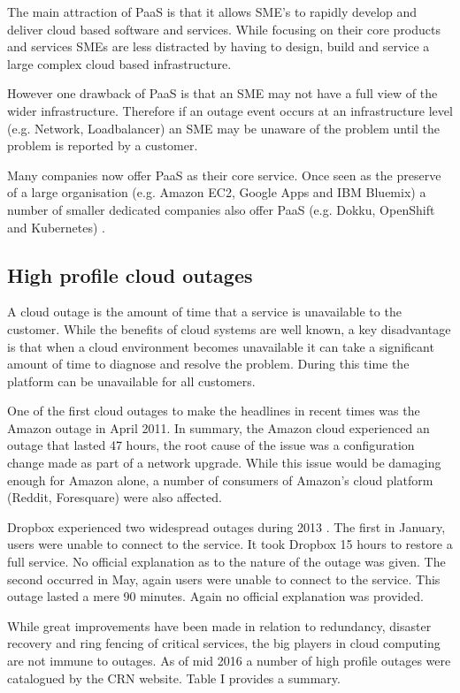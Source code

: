 \documentclass[5p]{elsarticle}
\begin{document}
The main attraction of PaaS is that it allows SME's to rapidly develop and deliver cloud based software and services. While focusing on their core products and services SMEs are less distracted by having to design, build and service a large complex cloud based infrastructure. 

However one drawback of PaaS is that an SME may not have a full view of the wider infrastructure. Therefore if an outage event occurs at an infrastructure level (e.g. Network, Loadbalancer) an SME may be unaware of the problem until the problem is reported by a customer.

Many companies now offer PaaS as their core service. Once seen as the preserve of a large organisation (e.g. Amazon EC2, Google Apps and IBM Bluemix) a number of smaller dedicated companies also offer PaaS (e.g. Dokku, OpenShift and Kubernetes) \cite{Paas2016}.


\subsection{High profile cloud outages}
A cloud outage is the amount of time that a service is unavailable to the customer. While the benefits of cloud systems are well known, a key disadvantage is that when a cloud environment becomes unavailable it can take a significant amount of time to diagnose and resolve the problem. During this time the platform can be unavailable for all customers.

One of the first cloud outages to make the headlines in recent times was the Amazon outage in April 2011. In summary, the Amazon cloud experienced an outage that lasted 47 hours, the root cause of the issue was a configuration change made as part of a network upgrade. While this issue would be damaging enough for Amazon alone, a number of consumers of Amazon's cloud platform (Reddit, Foresquare) were also affected. \cite{InfoWorld2015outage} 

Dropbox experienced two widespread outages during 2013 \cite{Talbot013DBoutage, Etherington2013DBoutage}. The first in January, users were unable to connect to the service. It took Dropbox 15 hours to restore a full service. No official explanation as to the nature of the outage was given. The second occurred in May, again users were unable to connect to the service. This outage lasted a mere 90 minutes. Again no official explanation was provided.

While great improvements have been made in relation to redundancy, disaster recovery and ring fencing of critical services, the big players in cloud computing are not immune to outages. As of mid 2016 a number of high profile outages were catalogued by the CRN website. \cite{CRN2016outage} Table I provides a summary. 
\end{document}
